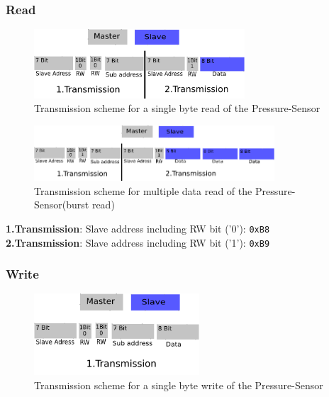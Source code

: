 \begin{itemize}
\begin{itemize}
\subsubsection{Read}
\label{subsubsec:Pressureread}

\begin{figure}[H]
	\centering\includegraphics[width=0.7\textwidth]{fig/I2C_Adressing/ACC_read_single}
	\caption[Scheme for a single byte read of the Pressure-Sensor]{Transmission scheme for a single byte read of the Pressure-Sensor}
	\label{fig:Pressure1}
\end{figure}

\begin{figure}[H]
	\centering\includegraphics[width=0.80\textwidth]{fig/I2C_Adressing/ACC_read_multiple}
	\caption[Scheme for multiple data read of the Pressure-Sensor]{Transmission scheme for multiple data read of the Pressure-Sensor(burst read)}
	\label{fig:Pressure2}
\end{figure}

\textbf{1.Transmission}: Slave address including RW bit ('0'): \texttt{0xB8}\\
\textbf{2.Transmission}: Slave address including RW bit ('1'): \texttt{0xB9}

\subsubsection{Write}
\label{subsubsec:Pressurewrite}

\begin{figure}[H]
	\centering\includegraphics[width=0.55\textwidth]{fig/I2C_Adressing/ACC_write_single}
	\caption[Scheme for a single byte write of the Pressure-Sensor]{Transmission scheme for a single byte write of the Pressure-Sensor}
	\label{fig:Pressure3}
\end{figure}


\end{itemize}
\end{itemize}

